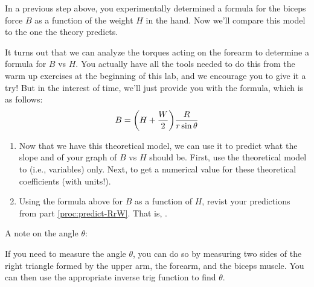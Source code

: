 In a previous step above,
you experimentally determined a formula for the biceps force $B$ as a function
of the weight $H$ in the hand.  
Now we'll compare this model to the one the theory predicts.

It turns out that we can analyze the torques acting on the forearm
to determine a formula for $B$ vs $H$.  You actually have all the tools needed
to do this from the warm up exercises at the beginning of this lab, and we
encourage you to give it a try!  But in the interest of time, we'll just
provide you with the formula, which is as follows:
\begin{equation*}
	B = {\left(  H + \frac{W}{2}  \right)}\frac{R}{r\sin\theta}
\end{equation*}


\begin{enumerate}[labproc]

\item
Now that we have this theoretical model, 
we can use it to predict what the slope and \yint of your graph 
of $B$ vs $H$ should be.
First, use the theoretical model to 
 (i.e., variables) only.
Next, 
to get a numerical value for these theoretical coefficients (with units!).

\item
Using the formula above for $B$ as a function of $H$, 
revist your predictions from part \ref{proc:predict-RrW}.
That is, .


\end{enumerate}

A note on the angle $\theta$:

If you need to measure the angle $\theta$,
you can do so by measuring two sides of the right triangle formed 
by the upper arm, the forearm, and the biceps muscle.
You can then use the appropriate inverse trig function to find $\theta$.


